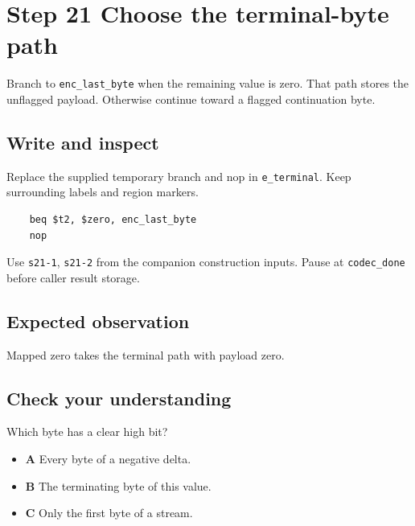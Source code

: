 \section{Step 21 Choose the terminal-byte path}\label{delta-s21}

Branch to \texttt{enc\_last\_byte} when the remaining value is zero. That path stores the unflagged payload. Otherwise continue toward a flagged continuation byte.

\subsection{Write and inspect}
Replace the supplied temporary branch and nop in \texttt{e\_terminal}. Keep surrounding labels and region markers.

\begin{verbatim}
    beq $t2, $zero, enc_last_byte
    nop
\end{verbatim}
Use \texttt{s21-1}, \texttt{s21-2} from the companion construction inputs. Pause at \texttt{codec\_done} before caller result storage.

\subsection{Expected observation}
Mapped zero takes the terminal path with payload zero.

\subsection{Check your understanding}
Which byte has a clear high bit?

\begin{itemize}
\item \textbf{A} Every byte of a negative delta.
\item \textbf{B} The terminating byte of this value.
\item \textbf{C} Only the first byte of a stream.
\end{itemize}
